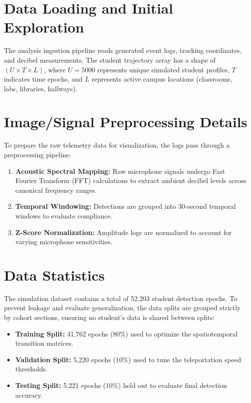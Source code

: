 \documentclass[12pt,a4paper,oneside]{report}
\begin{document}
\section{Data Loading and Initial Exploration}
The analysis ingestion pipeline reads generated event logs, tracking coordinates, and decibel measurements. The student trajectory array has a shape of $(U \times T \times L)$, where $U=5000$ represents unique simulated student profiles, $T$ indicates time epochs, and $L$ represents active campus locations (classrooms, labs, libraries, hallways).

\section{Image/Signal Preprocessing Details}
To prepare the raw telemetry data for visualization, the logs pass through a preprocessing pipeline:
\begin{enumerate}
    \item \textbf{Acoustic Spectral Mapping:} Raw microphone signals undergo Fast Fourier Transform (FFT) calculations to extract ambient decibel levels across canonical frequency ranges.
    \item \textbf{Temporal Windowing:} Detections are grouped into 30-second temporal windows to evaluate compliance.
    \item \textbf{Z-Score Normalization:} Amplitude logs are normalized to account for varying microphone sensitivities.
\end{enumerate}

\section{Data Statistics}
The simulation dataset contains a total of 52,203 student detection epochs. To prevent leakage and evaluate generalization, the data splits are grouped strictly by cohort sections, ensuring no student's data is shared between splits:
\begin{itemize}
    \item \textbf{Training Split:} 41,762 epochs (80\%) used to optimize the spatiotemporal transition matrices.
    \item \textbf{Validation Split:} 5,220 epochs (10\%) used to tune the teleportation speed thresholds.
    \item \textbf{Testing Split:} 5,221 epochs (10\%) held out to evaluate final detection accuracy.
\end{itemize}
\end{document}
